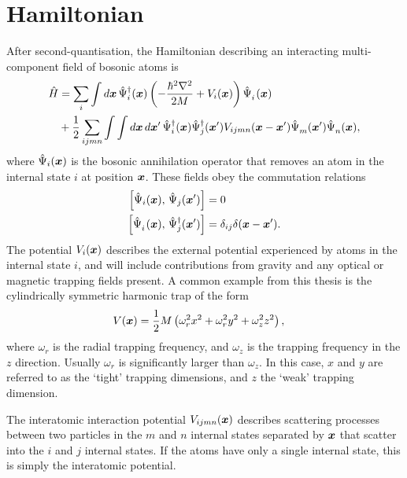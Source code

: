 \section{Hamiltonian}

After second-quantisation, the Hamiltonian describing an interacting multi-component field of bosonic atoms is
\begin{align}
    \label{BackgroundTheory:BasicHamiltonian}
    \begin{split}
        \hat{H} &=
            \sum_i \int d \vect{x}\, \hat{\Psi}_i^\dagger(\vect{x}) \left(- \frac{\hbar^2\nabla^2}{2 M} + V_{i}(\vect{x}) \right) \hat{\Psi}_i^{\phantom{\dagger}}(\vect{x})\\
            &+ \frac{1}{2}\sum_{i j m n} \int \int d\vect{x}\, d\vect{x}'\, \hat{\Psi}_i^\dagger(\vect{x}) \hat{\Psi}_j^\dagger(\vect{x}') V_{ijmn}(\vect{x} - \vect{x}') \hat{\Psi}_m^{\phantom{\dagger}}(\vect{x}') \hat{\Psi}_n^{\phantom{\dagger}}(\vect{x}),
    \end{split}
\end{align}
where $\hat{\Psi}_i(\bm{x})$ is the bosonic annihilation operator that removes an atom in the internal state $i$ at position $\bm{x}$.  These fields obey the commutation relations
\begin{align}
    \left[\hat{\Psi}_i(\bm{x}),\, \hat{\Psi}_j(\bm{x}') \right] &= 0\\
    \left[ \hat{\Psi}_i^{\phantom{\dagger}}(\bm{x}),\, \hat{\Psi}_j^{\dagger}(\bm{x}')\right] &= \delta_{ij} \delta(\bm{x} - \bm{x}').
\end{align}
The potential $V_i(\bm{x})$ describes the external potential experienced by atoms in the internal state $i$, and will include contributions from gravity and any optical or magnetic trapping fields present.  A common example from this thesis is the cylindrically symmetric harmonic trap of the form
\begin{align}
    V(\bm{x}) &= \frac{1}{2} M \left(\omega_r^2 x^2 + \omega_r^2 y^2 + \omega_z^2 z^2 \right),
\end{align}
where $\omega_r$ is the radial trapping frequency, and $\omega_z$ is the trapping frequency in the $z$ direction.  Usually $\omega_r$ is significantly larger than $\omega_z$.  In this case, $x$ and $y$ are referred to as the `tight' trapping dimensions, and $z$ the `weak' trapping dimension.

The interatomic interaction potential $V_{ijmn}(\bm{x})$ describes scattering processes between two particles in the $m$ and $n$ internal states separated by $\bm{x}$ that scatter into the $i$ and $j$ internal states.  If the atoms have only a single internal state, this is simply the interatomic potential.

